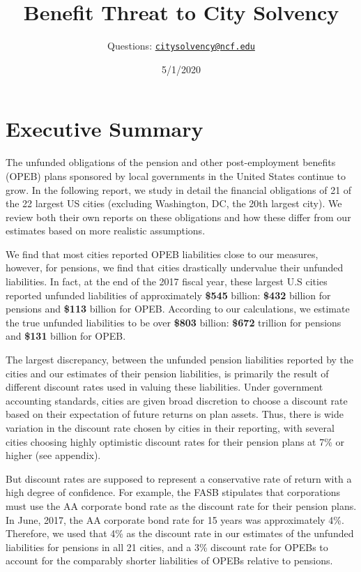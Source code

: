 \documentclass[
]{article}
\title{Benefit Threat to City Solvency}
\author{Questions:
\href{mailto:citysolvency@ncf.edu}{\nolinkurl{citysolvency@ncf.edu}}}
\date{5/1/2020}
\begin{document}
\maketitle

\hypertarget{executive-summary}{%
\section{Executive Summary}\label{executive-summary}}

The unfunded obligations of the pension and other post-employment
benefits (OPEB) plans sponsored by local governments in the United
States continue to grow. In the following report, we study in detail the
financial obligations of 21 of the 22 largest US cities (excluding
Washington, DC, the 20th largest city). We review both their own reports
on these obligations and how these differ from our estimates based on
more realistic assumptions.

We find that most cities reported OPEB liabilities close to our
measures, however, for pensions, we find that cities drastically
undervalue their unfunded liabilities. In fact, at the end of the 2017
fiscal year, these largest U.S cities reported unfunded liabilities of
approximately \textbf{\$545} billion: \textbf{\$432} billion for
pensions and \textbf{\$113} billion for OPEB. According to our
calculations, we estimate the true unfunded liabilities to be over
\textbf{\$803} billion: \textbf{\$672} trillion for pensions and
\textbf{\$131} billion for OPEB.

The largest discrepancy, between the unfunded pension liabilities
reported by the cities and our estimates of their pension liabilities,
is primarily the result of different discount rates used in valuing
these liabilities. Under government accounting standards, cities are
given broad discretion to choose a discount rate based on their
expectation of future returns on plan assets. Thus, there is wide
variation in the discount rate chosen by cities in their reporting, with
several cities choosing highly optimistic discount rates for their
pension plans at 7\% or higher (see appendix).

But discount rates are supposed to represent a conservative rate of
return with a high degree of confidence. For example, the FASB
stipulates that corporations must use the AA corporate bond rate as the
discount rate for their pension plans. In June, 2017, the AA corporate
bond rate for 15 years was approximately 4\%. Therefore, we used that
4\% as the discount rate in our estimates of the unfunded liabilities
for pensions in all 21 cities, and a 3\% discount rate for OPEBs to
account for the comparably shorter liabilities of OPEBs relative to
pensions.
\end{document}
